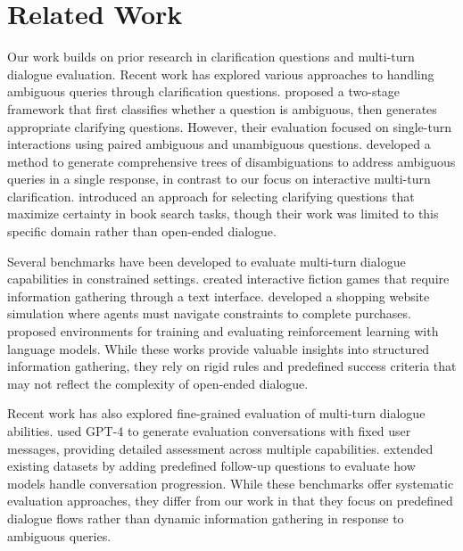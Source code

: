 \section{Related Work}
Our work builds on prior research in clarification questions and multi-turn dialogue evaluation. Recent work has explored various approaches to handling ambiguous queries through clarification questions. \citet{kuhn2022clam} proposed a two-stage framework that first classifies whether a question is ambiguous, then generates appropriate clarifying questions. However, their evaluation focused on single-turn interactions using paired ambiguous and unambiguous questions. \citet{kim2023tree} developed a method to generate comprehensive trees of disambiguations to address ambiguous queries in a single response, in contrast to our focus on interactive multi-turn clarification. \citet{chi2024clarinet} introduced an approach for selecting clarifying questions that maximize certainty in book search tasks, though their work was limited to this specific domain rather than open-ended dialogue.

Several benchmarks have been developed to evaluate multi-turn dialogue capabilities in constrained settings. \citet{hausknecht2020detective} created interactive fiction games that require information gathering through a text interface. \citet{yao2022webshop} developed a shopping website simulation where agents must navigate constraints to complete purchases. \citet{abdulhai2023lmrl} proposed environments for training and evaluating reinforcement learning with language models. While these works provide valuable insights into structured information gathering, they rely on rigid rules and predefined success criteria that may not reflect the complexity of open-ended dialogue.

Recent work has also explored fine-grained evaluation of multi-turn dialogue abilities. \citet{bai2024mtbench101} used GPT-4 to generate evaluation conversations with fixed user messages, providing detailed assessment across multiple capabilities. \citet{kwan2024mteval} extended existing datasets by adding predefined follow-up questions to evaluate how models handle conversation progression. While these benchmarks offer systematic evaluation approaches, they differ from our work in that they focus on predefined dialogue flows rather than dynamic information gathering in response to ambiguous queries.